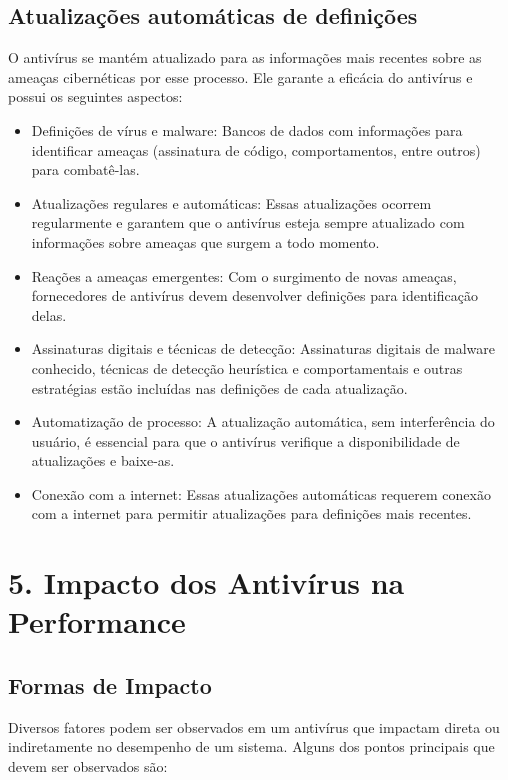 \documentclass[10pt,conference,twocolumn]{article}
\begin{document}
\subsection*{Atualizações automáticas de definições}
O antivírus se mantém atualizado para as informações mais recentes sobre as ameaças cibernéticas por esse processo. Ele garante a eficácia do antivírus e possui os seguintes aspectos:
\begin{itemize}
\item
Definições de vírus e malware: Bancos de dados com informações para identificar ameaças (assinatura de código, comportamentos, entre outros) para combatê-las.
\item
Atualizações regulares e automáticas: Essas atualizações ocorrem regularmente e garantem que o antivírus esteja sempre atualizado com informações sobre ameaças que surgem a todo momento.
\item
Reações a ameaças emergentes: Com o surgimento de novas ameaças, fornecedores de antivírus devem desenvolver definições para identificação delas.
\item
Assinaturas digitais e técnicas de detecção: Assinaturas digitais de malware conhecido, técnicas de detecção heurística e comportamentais e outras estratégias estão incluídas nas definições de cada atualização.
\item
Automatização de processo: A atualização automática, sem interferência do usuário, é essencial para que o antivírus verifique a disponibilidade de atualizações e baixe-as.
\item
Conexão com a internet: Essas atualizações automáticas requerem conexão com a internet para permitir atualizações para definições mais recentes.
\end{itemize}



\section* {5. Impacto dos Antivírus na Performance}
\subsection*{Formas de Impacto}
Diversos fatores podem ser observados em um antivírus que impactam direta ou indiretamente no desempenho de um sistema. Alguns dos pontos principais que devem ser observados são:
\end{document}
